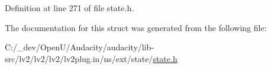 Definition at line 271 of file state.\+h.



The documentation for this struct was generated from the following file\+:\begin{DoxyCompactItemize}
\item 
C\+:/\+\_\+dev/\+Open\+U/\+Audacity/audacity/lib-\/src/lv2/lv2/lv2/lv2plug.\+in/ns/ext/state/\hyperlink{state_8h}{state.\+h}\end{DoxyCompactItemize}
